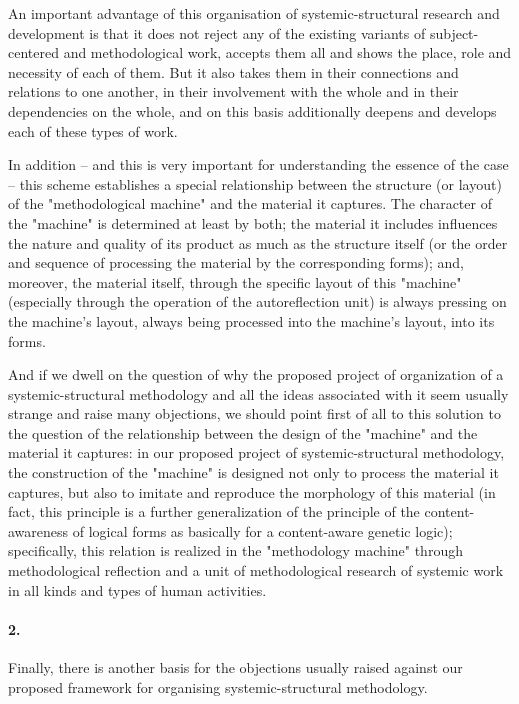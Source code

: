 \documentclass[11pt,a4paper]{article}
\begin{document}
An important advantage of this organisation of systemic-structural research
and development is that it does not reject any of the existing variants of
subject-centered and methodological work, accepts them all and shows the
place, role and necessity of each of them. But it also takes them in their
connections and relations to one another, in their involvement with the whole
and in their dependencies on the whole, and on this basis additionally deepens
and develops each of these types of work.

In addition – and this is very important for understanding the essence of the
case – this scheme establishes a special relationship between the structure
(or layout) of the "methodological machine" and the material it captures. The
character of the "machine" is determined at least by both; the material it
includes influences the nature and quality of its product as much as the
structure itself (or the order and sequence of processing the material by the
corresponding forms); and, moreover, the material itself, through the specific
layout of this "machine" (especially through the operation of the
autoreflection unit) is always pressing on the machine's layout, always being
processed into the machine's layout, into its forms.

And if we dwell on the question of why the proposed project of organization of
a systemic-structural methodology and all the ideas associated with it seem
usually strange and raise many objections, we should point first of all to
this solution to the question of the relationship between the design of the
"machine" and the material it captures: in our proposed project of
systemic-structural methodology, the construction of the "machine" is designed
not only to process the material it captures, but also to imitate and
reproduce the morphology of this material (in fact, this principle is a
further generalization of the principle of the content-awareness of logical
forms as basically for a content-aware genetic logic); specifically, this
relation is realized in the "methodology machine" through methodological
reflection and a unit of methodological research of systemic work in all kinds
and types of human activities.

\paragraph{2.}
Finally, there is another basis for the objections usually raised against our
proposed framework for organising systemic-structural methodology.
\end{document}
